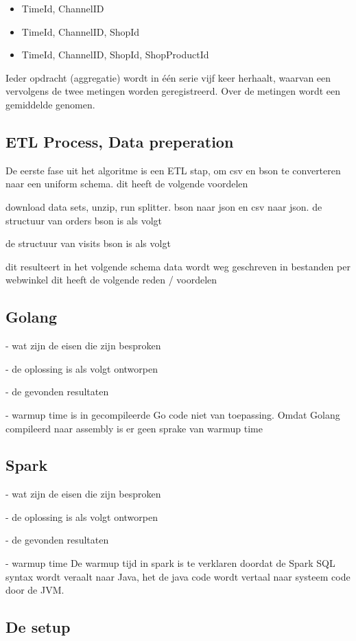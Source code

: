 \begin{itemize}
    \item TimeId, ChannelID
    \item TimeId, ChannelID, ShopId
    \item TimeId, ChannelID, ShopId, ShopProductId
\end{itemize}

Ieder opdracht (aggregatie) wordt in één serie vijf keer herhaalt, waarvan een vervolgens de twee metingen worden geregistreerd. Over de metingen wordt een gemiddelde genomen.

\subsection{ETL Process, Data preperation}

De eerste fase uit het algoritme is een ETL stap, om csv en bson te converteren naar een uniform schema.
dit heeft de volgende voordelen


download data sets, unzip, run splitter. bson naar json en csv naar json.
de structuur van orders bson is als volgt

de structuur van visits bson is als volgt

dit resulteert in het volgende schema
data wordt weg geschreven in bestanden per webwinkel
dit heeft de volgende reden / voordelen


\subsection{Golang}

- wat zijn de eisen die zijn besproken

- de oplossing is als volgt ontworpen

- de gevonden resultaten

- warmup time is in gecompileerde Go code niet van toepassing.
Omdat Golang compileerd naar assembly is er geen sprake van warmup time

\subsection{Spark}

- wat zijn de eisen die zijn besproken

- de oplossing is als volgt ontworpen

- de gevonden resultaten

- warmup time
De warmup tijd in spark is te verklaren doordat de Spark SQL syntax wordt veraalt naar Java, het de java code wordt vertaal naar systeem code door de JVM.


\subsection{De setup}
\label{subsec:3.4hardware_specs}







